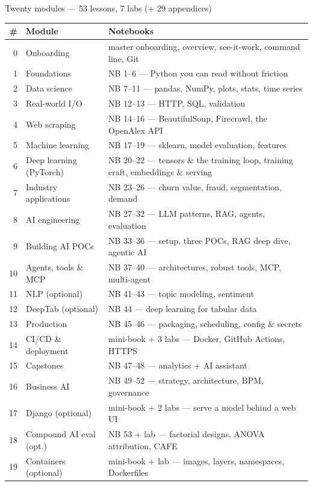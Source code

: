 \documentclass[aspectratio=169,11pt]{beamer}
\begin{document}
\begin{frame}{Twenty modules --- 53 lessons, 7 labs (+ 29 appendices)}
  \scriptsize
  \renewcommand{\arraystretch}{0.88}%
  \begin{tabular}{rll}
    \toprule
    \textbf{\#} & \textbf{Module} & \textbf{Notebooks} \\
    \midrule
    0 & Onboarding              & master onboarding, overview, see-it-work, command line, Git \\
    1 & Foundations             & NB 1–6 — Python you can read without friction \\
    2 & Data science            & NB 7–11 — pandas, NumPy, plots, stats, time series \\
    3 & Real-world I/O          & NB 12–13 — HTTP, SQL, validation \\
    4 & Web scraping            & NB 14–16 — BeautifulSoup, Firecrawl, the OpenAlex API \\
    5 & Machine learning        & NB 17–19 — sklearn, model evaluation, features \\
    6 & Deep learning (PyTorch) & NB 20–22 — tensors \& the training loop, training craft, embeddings \& serving \\
    7 & Industry applications   & NB 23–26 — churn value, fraud, segmentation, demand \\
    8 & AI engineering          & NB 27–32 — LLM patterns, RAG, agents, evaluation \\
    9 & Building AI POCs        & NB 33–36 — setup, three POCs, RAG deep dive, agentic AI \\
    10 & Agents, tools \& MCP    & NB 37–40 — architectures, robust tools, MCP, multi-agent \\
    11 & NLP (optional)          & NB 41–43 — topic modeling, sentiment \\
    12 & DeepTab (optional)      & NB 44 — deep learning for tabular data \\
    13 & Production              & NB 45–46 — packaging, scheduling, config \& secrets \\
    14 & CI/CD \& deployment     & mini-book + 3 labs — Docker, GitHub Actions, HTTPS \\
    15 & Capstones               & NB 47–48 — analytics + AI assistant \\
    16 & Business AI             & NB 49–52 — strategy, architecture, BPM, governance \\
    17 & Django (optional)       & mini-book + 2 labs — serve a model behind a web UI \\
    18 & Compound AI eval (opt.) & NB 53 + lab — factorial designs, ANOVA attribution, CAFE \\
    19 & Containers (optional)   & mini-book + lab — images, layers, namespaces, Dockerfiles \\
    \bottomrule
  \end{tabular}
  \vspace{4pt}


\end{frame}
\end{document}
